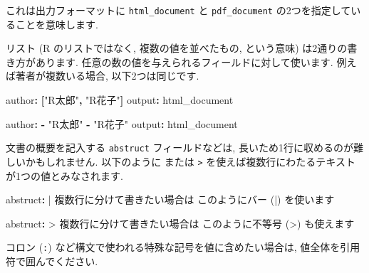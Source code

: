 \documentclass[
]{ltjsarticle}
\newenvironment{Shaded}{\begin{snugshade}}{\end{snugshade}}
\newcommand{\AttributeTok}[1]{\textcolor[rgb]{0.77,0.63,0.00}{#1}}
\newcommand{\CharTok}[1]{\textcolor[rgb]{0.31,0.60,0.02}{#1}}
\newcommand{\FunctionTok}[1]{\textcolor[rgb]{0.00,0.00,0.00}{#1}}
\newcommand{\KeywordTok}[1]{\textcolor[rgb]{0.13,0.29,0.53}{\textbf{#1}}}
\newcommand{\NormalTok}[1]{#1}
\newcommand{\StringTok}[1]{\textcolor[rgb]{0.31,0.60,0.02}{#1}}
\begin{document}
これは出力フォーマットに \texttt{html\_document} と \texttt{pdf\_document} の2つを指定していることを意味します.

リスト (R のリストではなく, 複数の値を並べたもの, という意味) は2通りの書き方があります. 任意の数の値を与えられるフィールドに対して使います. 例えば著者が複数いる場合, 以下2つは同じです.

\begin{Shaded}
\begin{Highlighting}[]
\FunctionTok{author}\KeywordTok{:}\AttributeTok{ }\KeywordTok{[}\StringTok{"R太郎"}\KeywordTok{,}\AttributeTok{ }\StringTok{"R花子"}\KeywordTok{]}
\FunctionTok{output}\KeywordTok{:}\AttributeTok{ html\_document}
\end{Highlighting}
\end{Shaded}

\begin{Shaded}
\begin{Highlighting}[]
\FunctionTok{author}\KeywordTok{:}
\AttributeTok{  }\KeywordTok{{-}}\AttributeTok{  }\StringTok{"R太郎"}
\AttributeTok{  }\KeywordTok{{-}}\AttributeTok{  }\StringTok{"R花子"}
\FunctionTok{output}\KeywordTok{:}\AttributeTok{ html\_document}
\end{Highlighting}
\end{Shaded}

文書の概要を記入する \texttt{abstruct} フィールドなどは, 長いため1行に収めるのが難しいかもしれません. 以下のように \texttt{\textbar{}} または \texttt{\textgreater{}} を使えば複数行にわたるテキストが1つの値とみなされます.

\begin{Shaded}
\begin{Highlighting}[]
\FunctionTok{abstruct}\KeywordTok{: }\CharTok{|}
\NormalTok{  複数行に分けて書きたい場合は}
\NormalTok{  このようにバー (\textasciigrave{}|\textasciigrave{}) を使います}
\end{Highlighting}
\end{Shaded}

\begin{Shaded}
\begin{Highlighting}[]
\FunctionTok{abstruct}\KeywordTok{: }\CharTok{\textgreater{}}
\NormalTok{  複数行に分けて書きたい場合は}
\NormalTok{  このように不等号 (\textasciigrave{}\textgreater{}\textasciigrave{}) も使えます}
\end{Highlighting}
\end{Shaded}

コロン (\texttt{:}) など構文で使われる特殊な記号を値に含めたい場合は, 値全体を引用符で囲んでください.
\end{document}

